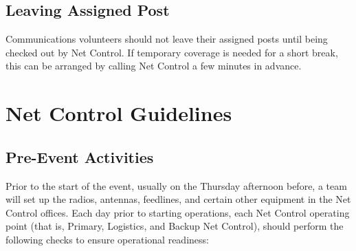 \documentclass[pdflatex,letterpaper,twoside,12pt]{book}
\begin{document}

\section{Leaving Assigned Post}

Communications volunteers should not leave their assigned posts until being checked out by Net Control.  If temporary coverage is needed for a short break, this can be arranged by calling Net Control a few minutes in advance.


\chapter{Net Control Guidelines}

\section{Pre-Event Activities}

Prior to the start of the event, usually on the Thursday afternoon before, a team will set up the radios, antennas, feedlines, and certain other equipment in the Net Control offices.  Each day prior to starting operations, each Net Control operating point (that is, Primary, Logistics, and Backup Net Control), should perform the following checks to ensure operational readiness:
\end{document}
